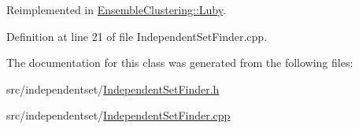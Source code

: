 Reimplemented in \hyperlink{class_ensemble_clustering_1_1_luby_add11d87f227097aae95de9c9c65822cc}{Ensemble\-Clustering\-::\-Luby}.



Definition at line 21 of file Independent\-Set\-Finder.\-cpp.



The documentation for this class was generated from the following files\-:\begin{DoxyCompactItemize}
\item 
src/independentset/\hyperlink{_independent_set_finder_8h}{Independent\-Set\-Finder.\-h}\item 
src/independentset/\hyperlink{_independent_set_finder_8cpp}{Independent\-Set\-Finder.\-cpp}\end{DoxyCompactItemize}
